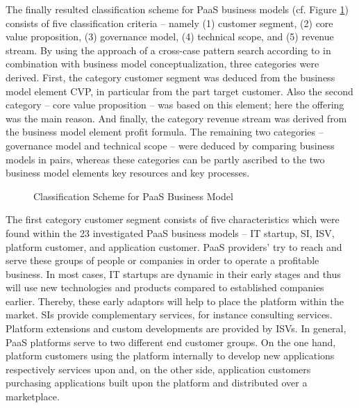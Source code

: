 The finally resulted classification scheme for \ac{PaaS} business models (cf. Figure \ref{fig:cs}) consists of five classification criteria -- namely (1) customer segment, (2) core value proposition, (3) governance model, (4) technical scope, and (5) revenue stream. By using the approach of a cross-case pattern search according to \citet{Eisenhardt1989} in combination with \citet{Johnson2008} business model conceptualization, three categories were derived. First, the category customer segment was deduced from the business model element \ac{CVP}, in particular from the part target customer. Also the second category -- core value proposition -- was based on this element; here the offering was the main reason. And finally, the category revenue stream was derived from the business model element profit formula. The remaining two categories -- governance model and technical scope -- were deduced by comparing business models in pairs, whereas these categories can be partly ascribed to the two business model elements key resources and key processes.

\begin{figure}[tb]
	\centering
	
	\caption{Classification Scheme for PaaS Business Model}
	\label{fig:cs}
\end{figure}

The first category customer segment consists of five characteristics which were found within the 23 investigated \ac{PaaS} business models --  IT startup, \ac{SI}, \ac{ISV}, platform customer, and application customer. \ac{PaaS} providers' try to reach and serve these groups of people or companies in order to operate a profitable business. In most cases, IT startups are dynamic in their early stages and thus will use new technologies and products compared to established companies earlier. Thereby, these early adaptors will help to place the platform within the market. \acp{SI} provide complementary services, for instance consulting services. Platform extensions and custom developments are provided by \acp{ISV}. In general, \ac{PaaS} platforms serve to two different end customer groups. On the one hand, platform customers using the platform internally to develop new applications respectively services upon and, on the other side, application customers purchasing applications built upon the platform and distributed over a marketplace.

